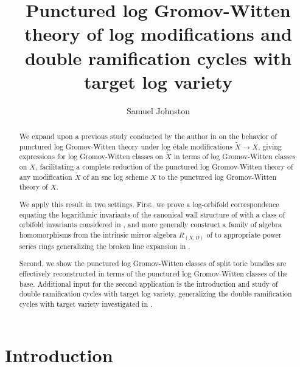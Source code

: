 \documentclass[12pt, oneside]{amsart}   	%
\title[Log GW theory of log \'etale models]{Punctured log Gromov-Witten theory of log modifications and double ramification cycles with target log variety}
\author{Samuel Johnston}
\date{}
\newcounter{thm}
\numberwithin{equation}{section}
\numberwithin{thm}{section}
\numberwithin{figure}{section}
\begin{document}
\begin{abstract}
We expand upon a previous study conducted by the author in \cite{pbirinv} on the behavior of punctured log Gromov-Witten theory under log \'etale modifications $\widetilde{X} \rightarrow X$, giving expressions for log Gromov-Witten classes on $\widetilde{X}$ in terms of log Gromov-Witten classes on $X$, facilitating a complete reduction of the punctured log Gromov-Witten theory of any modification $\widetilde{X}$ of an snc log scheme $X$ to the punctured log Gromov-Witten theory of $X$. 
 
 We apply this result in two settings. First, we prove a log-orbifold correspondence equating the logarithmic invariants of the canonical wall structure of \cite{scatt} with a class of orbifold invariants considered in \cite{orbBL}, and more generally construct a family of algebra homomorphisms from the intrinsic mirror algebra $R_{(X,D)}$ of \cite{int_mirror} to appropriate power series rings generalizing the broken line expansion in \cite{scatt}. 
 
Second, we show the punctured log Gromov-Witten classes of split toric bundles are effectively reconstructed in terms of the punctured log Gromov-Witten classes of the base. Additional input for the second application is the introduction and study of double ramification cycles with target log variety, generalizing the double ramification cycles with target variety investigated in \cite{DRtarget}.
\end{abstract}


\maketitle

\section{Introduction}
\end{document}
